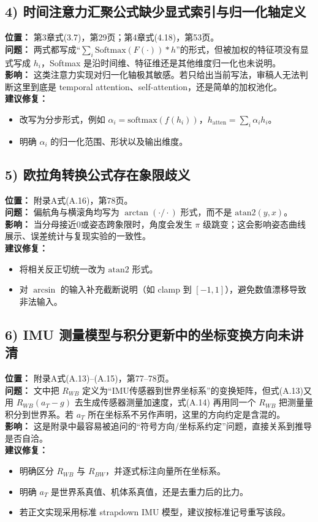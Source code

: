 \documentclass[12pt]{ctexart}
\begin{document}
\subsection*{4) 时间注意力汇聚公式缺少显式索引与归一化轴定义}
\textbf{位置：} 第3章式(3.7)，第29页；第4章式(4.18)，第53页。\\
\textbf{问题：} 两式都写成“\(\sum_i \mathrm{Softmax}(F(\cdot))*h\)”的形式，但被加权的特征项没有显式写成 \(h_i\)，Softmax 是沿时间维、特征维还是其他维度归一化也未说明。\\
\textbf{影响：} 这类注意力实现对归一化轴极其敏感。若只给出当前写法，审稿人无法判断这里到底是 temporal attention、self-attention，还是简单的加权池化。\\
\textbf{建议修复：}
\begin{itemize}
  \item 改写为分步形式，例如 \(\alpha_i=\mathrm{softmax}(f(h_i))\)，\(h_{\mathrm{atten}}=\sum_i \alpha_i h_i\)。
  \item 明确 \(\alpha_i\) 的归一化范围、形状以及输出维度。
\end{itemize}

\subsection*{5) 欧拉角转换公式存在象限歧义}
\textbf{位置：} 附录A式(A.16)，第78页。\\
\textbf{问题：} 偏航角与横滚角均写为 \(\arctan(\cdot/\cdot)\) 形式，而不是 \(\mathrm{atan2}(y,x)\)。\\
\textbf{影响：} 当分母接近0或姿态跨象限时，角度会发生 \(\pi\) 级跳变；这会影响姿态曲线展示、误差统计与复现实验的一致性。\\
\textbf{建议修复：}
\begin{itemize}
  \item 将相关反正切统一改为 \(\mathrm{atan2}\) 形式。
  \item 对 \(\arcsin\) 的输入补充截断说明（如 clamp 到 \([-1,1]\)），避免数值漂移导致非法输入。
\end{itemize}

\subsection*{6) IMU 测量模型与积分更新中的坐标变换方向未讲清}
\textbf{位置：} 附录A式(A.13)--(A.15)，第77--78页。\\
\textbf{问题：} 文中把 \(R_{WB}\) 定义为“IMU传感器到世界坐标系”的变换矩阵，但式(A.13)又用 \(R_{WB}(a_T-g)\) 去生成传感器测量加速度，式(A.14) 再用同一个 \(R_{WB}\) 把测量量积分到世界系。若 \(a_T\) 所在坐标系不另作声明，这里的方向约定是含混的。\\
\textbf{影响：} 这是附录中最容易被追问的“符号方向/坐标系约定”问题，直接关系到推导是否自洽。\\
\textbf{建议修复：}
\begin{itemize}
  \item 明确区分 \(R_{WB}\) 与 \(R_{BW}\)，并逐式标注向量所在坐标系。
  \item 明确 \(a_T\) 是世界系真值、机体系真值，还是去重力后的比力。
  \item 若正文实现采用标准 strapdown IMU 模型，建议按标准记号重写该段。
\end{itemize}
\end{document}
